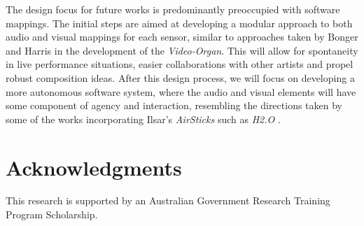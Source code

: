 \documentclass{nime-alternate}
\begin{document}
The design focus for future works is predominantly preoccupied with software mappings. The initial steps are aimed at developing a modular approach to both audio and visual mappings for each sensor, similar to approaches taken by Bonger and Harris in the development of the 
\textit{Video-Organ}\cite{bongers:structured}. This will allow for spontaneity in live performance situations, easier collaborations with other artists and propel robust composition ideas. After this design process, we will focus on developing a more autonomous software system, where the audio and visual elements will have some component of agency and interaction, resembling the directions taken by some of the works incorporating 
Ilsar's \textit{AirSticks} 
such as \textit{H2.O}
\cite{ilsar:airsticks}. 






\section{Acknowledgments}


This research is supported by an Australian Government Research Training Program Scholarship.




 
\end{document}
